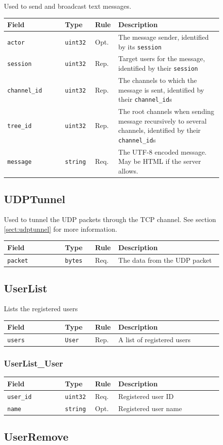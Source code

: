 \documentclass[11pt]{article} %
\newenvironment{mumbleMessageEx}
{%
	\small
	\renewcommand\arraystretch{1.5}
	\begin{tabular}{p{0.25\linewidth}p{0.13\linewidth}p{0.05\linewidth}p{0.45\linewidth}}
	Field & Type & Rule & Description \\
	\hline
}
{%
	\end{tabular}
	\renewcommand\arraystretch{1.0}
}
\newcommand{\mumbleMessageExItem}[4]{ \texttt{#1} & \texttt{#2} & #3 & #4 \\ }
\begin{document}
Used to send and broadcast text messages.

\begin{mumbleMessageEx}
\mumbleMessageExItem{actor}{uint32}{Opt.}{The message sender, identified by its \texttt{session}}
\mumbleMessageExItem{session}{uint32}{Rep.}{Target users for the message, identified by their \texttt{session}}
\mumbleMessageExItem{channel\_id}{uint32}{Rep.}{The channels to which the message is sent, identified by their \texttt{channel\_id}s}
\mumbleMessageExItem{tree\_id}{uint32}{Rep.}{The root channels when sending message recursively to several channels, identified by their \texttt{channel\_id}s}
\mumbleMessageExItem{message}{string}{Req.}{The UTF-8 encoded message. May be HTML if the server allows.}
\end{mumbleMessageEx}

\subsection{UDPTunnel}
\label{msg:udpTunnel}

Used to tunnel the UDP packets through the TCP channel. See section \ref{sect:udptunnel} for more information.

\begin{mumbleMessageEx}
\mumbleMessageExItem{packet}{bytes}{Req.}{The data from the UDP packet}
\end{mumbleMessageEx}

\subsection{UserList}
\label{msg:userList}

Lists the registered users

\begin{mumbleMessageEx}
\mumbleMessageExItem{users}{User}{Rep.}{A list of registered users}
\end{mumbleMessageEx}

\subsubsection{UserList\_User}
\label{msg:userList:user}

\begin{mumbleMessageEx}
\mumbleMessageExItem{user\_id}{uint32}{Req.}{Registered user ID}
\mumbleMessageExItem{name}{string}{Opt.}{Registered user name}
\end{mumbleMessageEx}

\subsection{UserRemove}
\label{msg:userRemove}
\end{document}
